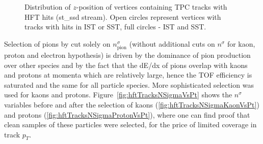 \begin{figure}[b!]
\begin{minipage}{.4725\textwidth}
  \caption[Distribution of $z$-position of vertices with TPC tracks containing hits in HFT.]
   {Distribution of $z$-position of vertices containing TPC tracks with HFT hits (st\_ssd stream). Open circles represent vertices with tracks with hits in IST or SST, full circles - IST and SST.}
   \label{fig:zVtxHFT}%
\end{minipage}%
\end{figure}%

\noindent Selection of pions by cut solely on $n^{\sigma}_{\text{pion}}$ (without additional cuts on $n^{\sigma}$ for kaon, proton and electron hypothesis) is driven by the dominance of pion production over other species and by the fact that the dE/dx of pions overlap with kaons and protons at momenta which are relatively large, hence the TOF efficiency is saturated and the same for all particle species. More sophisticated selection was used for kaons and protons. Figure~\ref{fig:hftTracksNSigmaVsPt} shows the $n^{\sigma}$ variables before and after the selection of kaons (\ref{fig:hftTracksNSigmaKaonVsPt}) and protons (\ref{fig:hftTracksNSigmaProtonVsPt}), where one can find proof that clean samples of these particles were selected, for the price of limited coverage in track $p_{T}$.
